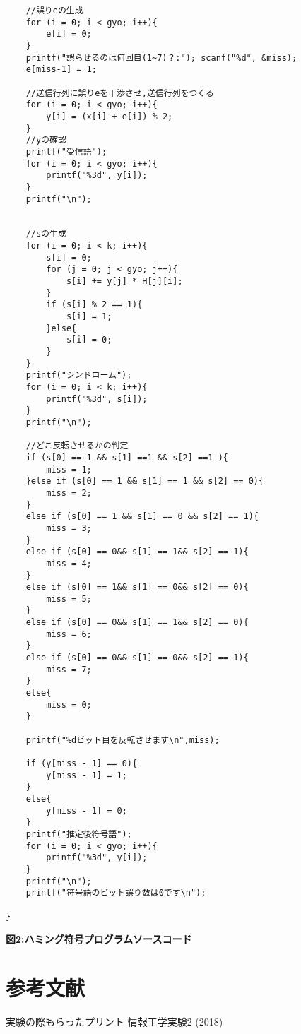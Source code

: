 \documentclass[12pt]{jarticle}
\begin{document}
\begin{center}
\begin{verbatim}
	//誤りeの生成
	for (i = 0; i < gyo; i++){
		e[i] = 0;
	}
	printf("誤らせるのは何回目(1~7)？:"); scanf("%d", &miss);
	e[miss-1] = 1;
	
	//送信行列に誤りeを干渉させ,送信行列をつくる
	for (i = 0; i < gyo; i++){
		y[i] = (x[i] + e[i]) % 2;
	}
	//yの確認
	printf("受信語");
	for (i = 0; i < gyo; i++){
		printf("%3d", y[i]);
	}
	printf("\n");


	//sの生成
	for (i = 0; i < k; i++){
		s[i] = 0;
		for (j = 0; j < gyo; j++){
			s[i] += y[j] * H[j][i];
		}
		if (s[i] % 2 == 1){
			s[i] = 1;
		}else{
			s[i] = 0;
		}
	}
	printf("シンドローム");
	for (i = 0; i < k; i++){
		printf("%3d", s[i]);
	}
	printf("\n");

	//どこ反転させるかの判定
	if (s[0] == 1 && s[1] ==1 && s[2] ==1 ){
		miss = 1;
	}else if (s[0] == 1 && s[1] == 1 && s[2] == 0){
		miss = 2;
	}
	else if (s[0] == 1 && s[1] == 0 && s[2] == 1){
		miss = 3;
	}
	else if (s[0] == 0&& s[1] == 1&& s[2] == 1){
		miss = 4;
	}
	else if (s[0] == 1&& s[1] == 0&& s[2] == 0){
		miss = 5;
	}
	else if (s[0] == 0&& s[1] == 1&& s[2] == 0){
		miss = 6;
	}
	else if (s[0] == 0&& s[1] == 0&& s[2] == 1){
		miss = 7;
	}
	else{
		miss = 0;
	}

	printf("%dビット目を反転させます\n",miss);

	if (y[miss - 1] == 0){
		y[miss - 1] = 1;
	}
	else{
		y[miss - 1] = 0;
	}
	printf("推定後符号語");
	for (i = 0; i < gyo; i++){
		printf("%3d", y[i]);
	}
	printf("\n");
	printf("符号語のビット誤り数は0です\n");

}

\end{verbatim}
\textbf{図2:ハミング符号プログラムソースコード}
\end{center}

\section{参考文献}
\begin{thebibliography}{2}
\bibitem{}  実験の際もらったプリント
  \bibitem{} 情報工学実験2 (2018)
  \end{thebibliography}
\end{document}
